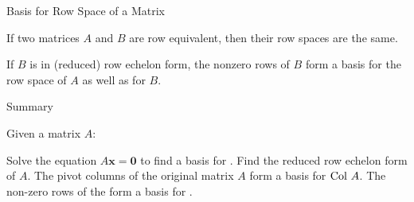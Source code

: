 \documentclass[xcolor=dvipsnames,aspectratio=169,t]{beamer}
\begin{document}
\begin{frame}{Basis for Row Space of a Matrix}
  \bigskip

  \begin{theorem}
  If two matrices $A$ and $B$ are row equivalent, then their \alert{row spaces} are the same.
  \medskip

  If $B$ is in (reduced) row echelon form, the nonzero rows of $B$ form a basis for the row space of $A$ as well as for $B$.
  \end{theorem}
\end{frame}


\begin{frame}{Summary}
  \bigskip

  Given a matrix $A$:
  \medskip

  \bi
  \ii Solve the equation $A\mathbf{x} = \mathbf{0}$ to find a basis for . \medskip
  \pause
  \ii Find the reduced row echelon form of $A$. \medskip
  \ii \quad The pivot columns of the \alert{original matrix $A$} form a basis for \alert{$\mbox{Col } A$}. \medskip
  \ii \quad The non-zero rows of the  form a basis for .
  \ei

\end{frame}
\end{document}
